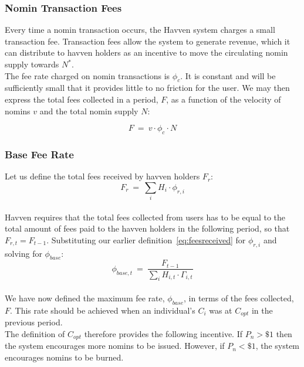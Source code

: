 \newpage

\subsubsection{Nomin Transaction Fees}
Every time a nomin transaction occurs, the Havven system charges a small
transaction fee. Transaction fees allow the system to generate revenue, which
it can distribute to havven holders as an incentive to move the circulating nomin supply
towards \(N^*\). \\

\noindent The fee rate charged on nomin transactions is \(\phi_c\). It is
constant and will be sufficiently small that it provides little to no
friction for the user. We may then express the total fees collected in a period,
\(F\), as a function of the velocity of nomins \(v\) and the total
nomin supply \(N\):

\begin{equation}
    F \ = \ v \cdot \phi_c \cdot N
\end{equation}

\subsubsection{Base Fee Rate}

Let us define the total fees received by havven holders \(F_{r}\): \\

\begin{equation}
F_{r} \ = \ \sum_{i} H_{i} \cdot \phi_{r,i} \label{eq:totalfeesreceived}
\end{equation} \\

\noindent Havven requires that the total fees collected from users has to be
equal to the total amount of fees paid to the havven holders in the following period, so that \(F_{r,t}
= F_{t-1}\). Substituting our earlier definition~\eqref{eq:feesreceived} for
\(\phi_{r,i}\) and solving for \(\phi_{base} \): \\

\begin{equation}
\phi_{base,t} \ = \ \frac{F_{t-1}}{\sum_{i} H_{i,t} \cdot \mathit{\Gamma}_{i,t}} \label{eq:feebase}
\end{equation} \\

\noindent We have now defined the maximum fee rate, \(\phi_{base}\), in terms
of the fees collected, \(F\). This rate should be achieved when an individual's
\(C_i\) was at \(C_{opt}\) in the previous period. \\

\noindent The definition of \(C_{opt}\) therefore provides the following
incentive. If \(P_n > \$1\) then the system encourages more nomins to be
issued. However, if \(P_n < \$1\), the system encourages nomins to be
burned.
